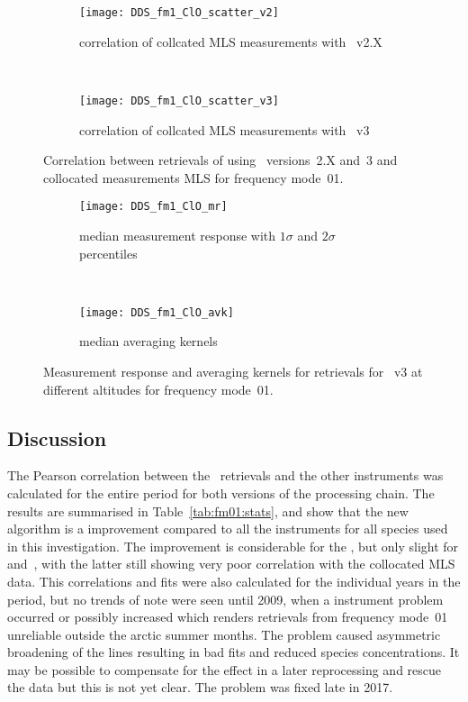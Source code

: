 \begin{figure}[tbhp]
    \centering
    \begin{subfigure}[b]{0.49\textwidth}
        \texttt{[image: DDS\_fm1\_ClO\_scatter\_v2]}
        \caption{correlation of collcated MLS measurements with \smr~v2.X}
        \label{fig:fm01:ClO:scatter:v2}
    \end{subfigure}
    \,
    \begin{subfigure}[b]{0.49\textwidth}
        \texttt{[image: DDS\_fm1\_ClO\_scatter\_v3]}
        \caption{correlation of collcated MLS measurements with \smr~v3}
        \label{fig:fm01:ClO:scatter:v3}
    \end{subfigure}
    \caption{Correlation between retrievals of  using \smr\
    versions~2.X and~3 and collocated measurements MLS for frequency mode~01.}
    \label{fig:fm01:ClO:scatter}
\end{figure}

\begin{figure}[tbhp]
    \centering
    \begin{subfigure}[b]{0.49\textwidth}
        \texttt{[image: DDS\_fm1\_ClO\_mr]}
        \caption{median measurement response with $1\sigma$ and $2\sigma$
        percentiles}
        \label{fig:fm01:ClO:mr}
    \end{subfigure}
    \,
    \begin{subfigure}[b]{0.49\textwidth}
        \texttt{[image: DDS\_fm1\_ClO\_avk]}
        \caption{median averaging kernels\newline~}
        \label{fig:fm01:ClO:avk}
    \end{subfigure}
    \caption{Measurement response and averaging kernels for 
    retrievals for \smr~v3 at different altitudes for frequency mode~01.}
    \label{fig:fm01:ClO:mr_avk}
\end{figure}


\subsection{Discussion}
\label{sec:fm01:discussion}
The Pearson correlation between the \smr\ retrievals and the other instruments
was calculated for the entire period for both versions of the processing chain.
The results are summarised in Table~\ref{tab:fm01:stats}, and show that the
new algorithm is a improvement compared to all the instruments for all species
used in this investigation. The improvement is considerable for the \chem{O_3},
but only slight for \chem{N_2O} and~\chem{ClO}, with the latter still showing
very poor correlation with the collocated MLS data. This correlations and fits
were also calculated for the individual years in the period, but no trends of
note were seen until 2009, when a instrument problem occurred or possibly
increased which renders retrievals from frequency mode~01 unreliable outside
the arctic summer months.  The problem caused asymmetric broadening of the
lines resulting in bad fits and reduced species concentrations. It may be
possible to compensate for the effect in a later reprocessing and rescue the
data but this is not yet clear. The problem was fixed late in 2017.



